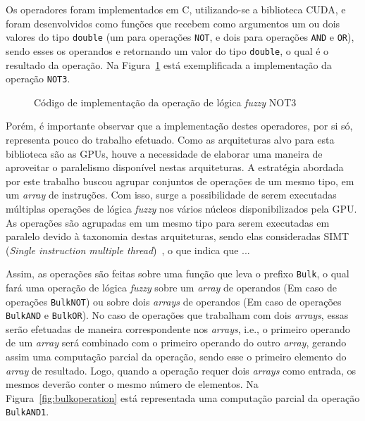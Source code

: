 \documentclass[12pt]{article}
\begin{document}
Os operadores foram implementados em C, utilizando-se a biblioteca CUDA, e foram desenvolvidos como funções que recebem como argumentos um ou dois valores do tipo \texttt{double} (um para operações \texttt{NOT}, e dois para operações \texttt{AND} e \texttt{OR}), sendo esses os operandos e retornando um valor do tipo \texttt{double}, o qual é o resultado da operação. Na Figura~\ref{fig:operation} está exemplificada a implementação da operação \texttt{NOT3}.

\begin{figure}[!h]
\centering

\caption{Código de implementação da operação de lógica \textit{fuzzy} NOT3}
\label{fig:operation}
\end{figure}

Porém, é importante observar que a implementação destes operadores, por si só, representa pouco do trabalho efetuado. Como as arquiteturas alvo para esta biblioteca são as GPUs, houve a necessidade de elaborar uma maneira de aproveitar o paralelismo disponível nestas arquiteturas. A estratégia abordada por este trabalho buscou agrupar conjuntos de operações de um mesmo tipo, em um \textit{array} de instruções. Com isso, surge a possibilidade de serem executadas múltiplas operações de lógica \textit{fuzzy} nos vários núcleos disponibilizados pela GPU. As operações são agrupadas em um mesmo tipo para serem executadas em paralelo devido à taxonomia destas arquiteturas, sendo elas consideradas SIMT (\textit{Single instruction multiple thread})~\cite{keckler:11}, o que indica que ...

Assim, as operações são feitas sobre uma função que leva o prefixo \texttt{Bulk}, o qual fará uma operação de lógica \textit{fuzzy} sobre um \textit{array} de operandos (Em caso de operações \texttt{BulkNOT}) ou sobre dois \textit{arrays} de operandos (Em caso de operações \texttt{BulkAND} e \texttt{BulkOR}). No caso de operações que trabalham com dois \textit{arrays}, essas serão efetuadas de maneira correspondente nos \textit{arrays}, i.e., o primeiro operando de um \textit{array} será combinado com o primeiro operando do outro \textit{array}, gerando assim uma computação parcial da operação, sendo esse o primeiro elemento do \textit{array} de resultado. Logo, quando a operação requer dois \textit{arrays} como entrada, os mesmos deverão conter o mesmo número de elementos. Na Figura~\ref{fig:bulkoperation} está representada uma computação parcial da operação \texttt{BulkAND1}.
\end{document}
